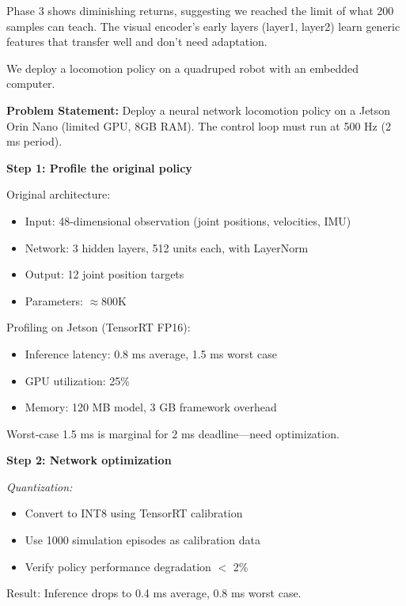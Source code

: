 \begin{example}
Phase 3 shows diminishing returns, suggesting we reached the limit of what 200 samples can teach. The visual encoder's early layers (layer1, layer2) learn generic features that transfer well and don't need adaptation.
\end{example}

\begin{example}
\label{ex:embedded_deployment}
We deploy a locomotion policy on a quadruped robot with an embedded computer.

\textbf{Problem Statement:}
Deploy a neural network locomotion policy on a Jetson Orin Nano (limited GPU, 8GB RAM). The control loop must run at 500 Hz (2 ms period).

\textbf{Step 1: Profile the original policy}

Original architecture:
\begin{itemize}
    \item Input: 48-dimensional observation (joint positions, velocities, IMU)
    \item Network: 3 hidden layers, 512 units each, with LayerNorm
    \item Output: 12 joint position targets
    \item Parameters: $\approx$800K
\end{itemize}

Profiling on Jetson (TensorRT FP16):
\begin{itemize}
    \item Inference latency: 0.8 ms average, 1.5 ms worst case
    \item GPU utilization: 25\%
    \item Memory: 120 MB model, 3 GB framework overhead
\end{itemize}

Worst-case 1.5 ms is marginal for 2 ms deadline---need optimization.

\textbf{Step 2: Network optimization}

\textit{Quantization:}
\begin{itemize}
    \item Convert to INT8 using TensorRT calibration
    \item Use 1000 simulation episodes as calibration data
    \item Verify policy performance degradation $<$ 2\%
\end{itemize}

Result: Inference drops to 0.4 ms average, 0.8 ms worst case.


\end{example}
